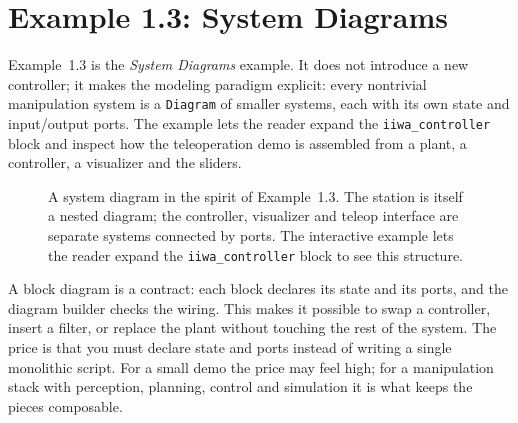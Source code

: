 \documentclass[11pt]{article}
\begin{document}
\section{Example 1.3: System Diagrams}

Example~1.3 is the \emph{System Diagrams} example.  It does not introduce a
new controller; it makes the modeling paradigm explicit: every nontrivial
manipulation system is a \texttt{Diagram} of smaller systems, each with its own
state and input/output ports.  The example lets the reader expand the
\texttt{iiwa\_controller} block and inspect how the teleoperation demo is
assembled from a plant, a controller, a visualizer and the sliders.

\begin{figure}[htbp]
\centering
{}
\caption{A system diagram in the spirit of Example~1.3.  The station is
itself a nested diagram; the controller, visualizer and teleop interface are
separate systems connected by ports.  The interactive example lets the reader
expand the \texttt{iiwa\_controller} block to see this structure.}
\label{fig:system_diagram}
\end{figure}

\begin{intuition}[breakable=false,title={Why block diagrams are worth the overhead}]
A block diagram is a contract: each block declares its state and its ports,
and the diagram builder checks the wiring.  This makes it possible to swap a
controller, insert a filter, or replace the plant without touching the rest of
the system.  The price is that you must declare state and ports instead of
writing a single monolithic script.  For a small demo the price may feel high;
for a manipulation stack with perception, planning, control and simulation it
is what keeps the pieces composable.
\end{intuition}
\end{document}
